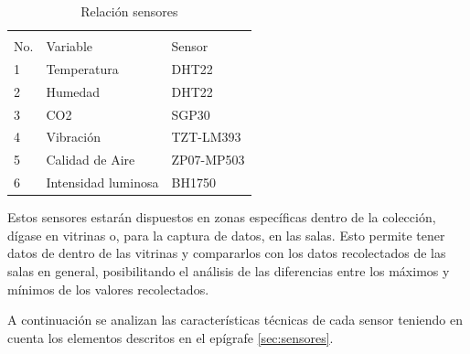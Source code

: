     \begin{table}[H]
        \centering
        \caption{Relación sensores}
        \label{tab:relacion_sensores}
        \begin{tabular}{|l|l|l|}
        \hline
        \cellcolor[HTML]{9698ED}                      & \cellcolor[HTML]{9698ED}                           & \cellcolor[HTML]{9698ED}                         \\
        \multirow{-2}{*}{\cellcolor[HTML]{9698ED}No.} & \multirow{-2}{*}{\cellcolor[HTML]{9698ED}Variable} & \multirow{-2}{*}{\cellcolor[HTML]{9698ED}Sensor} \\ \hline
        1                                             & Temperatura                                        & DHT22                                            \\ \hline
        2                                             & Humedad                                            & DHT22                                            \\ \hline
        3                                             & CO2                                                & SGP30                                            \\ \hline
        4                                             & Vibración                                          & TZT-LM393                                        \\ \hline
        5                                             & Calidad de Aire                                    & ZP07-MP503                                       \\ \hline
        6                                             & Intensidad luminosa                                & BH1750                                           \\ \hline
        \end{tabular}
    \end{table}

    Estos sensores estarán dispuestos en zonas específicas dentro de la colección, dígase en vitrinas o, para la captura de datos, en las salas.
    Esto permite tener datos de dentro de las vitrinas y compararlos con los datos recolectados de las salas en general, posibilitando el análisis de las diferencias entre los máximos y mínimos de los valores recolectados.
    
    A continuación se analizan las características técnicas de cada sensor teniendo en cuenta los elementos descritos en el epígrafe \ref{sec:sensores}.

